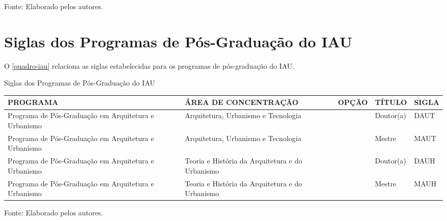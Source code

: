 \begin{apendicesenv}
\begin{quadro}[htb]
\begin{tabular}{|p{6.0cm}|p{4.5cm}|p{2.0cm}|p{1.75cm}|}
    \hline
\end{tabular}
\begin{flushleft}
		Fonte: Elaborado pelos autores.\
\end{flushleft}
\end{quadro}

\chapter{Siglas dos Programas de Pós-Graduação do IAU}
O \autoref{quadro-iau} relaciona as siglas estabelecidas para os programas de pós-graduação do IAU.
\begin{quadro}[htb]
\ABNTEXfontereduzida
\caption[Siglas dos Programas de Pós-Graduação do IAU]{Siglas dos Programas de Pós-Graduação do IAU}
\label{quadro-iau}
\begin{tabular}{|p{3.5cm}|p{3.5cm}|p{3.5cm}|p{1.5cm}|p{2.25cm}|}
  \hline
   \textbf{PROGRAMA} & \textbf{ÁREA DE CONCENTRAÇÃO} & \textbf{OPÇÃO} & \textbf{TÍTULO} & \textbf{SIGLA}  \\
    \hline
Programa de Pós-Graduação em Arquitetura e Urbanismo & Arquitetura, Urbanismo e Tecnologia &  & Doutor(a) & DAUT\\
Programa de Pós-Graduação em Arquitetura e Urbanismo & Arquitetura, Urbanismo e Tecnologia &  & Mestre & MAUT\\
Programa de Pós-Graduação em Arquitetura e Urbanismo & Teoria e História da Arquitetura e do Urbanismo &  & Doutor(a) & DAUH\\
Programa de Pós-Graduação em Arquitetura e Urbanismo & Teoria e História da Arquitetura e do Urbanismo &  & Mestre & MAUH\\
    \hline

\end{tabular}
\begin{flushleft}
		Fonte: Elaborado pelos autores.\
\end{flushleft}
\end{quadro}


\end{apendicesenv}
